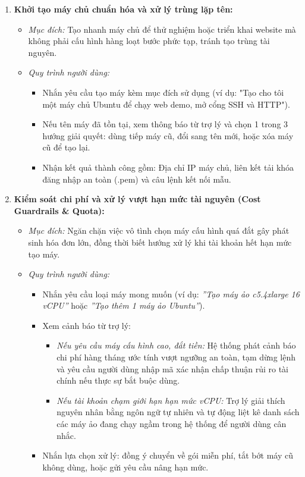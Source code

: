 \documentclass[a4paper,12pt]{article}
\begin{document}
\begin{enumerate}
  \item \textbf{Khởi tạo máy chủ chuẩn hóa và xử lý trùng lặp tên:}
  \begin{itemize}
    \item \textit{Mục đích:} Tạo nhanh máy chủ để thử nghiệm hoặc triển khai website mà không phải cấu hình hàng loạt bước phức tạp, tránh tạo trùng tài nguyên.
    \item \textit{Quy trình người dùng:} 
    \begin{itemize}
      \item Nhắn yêu cầu tạo máy kèm mục đích sử dụng (ví dụ: "Tạo cho tôi một máy chủ Ubuntu để chạy web demo, mở cổng SSH và HTTP").
      \item Nếu tên máy đã tồn tại, xem thông báo từ trợ lý và chọn 1 trong 3 hướng giải quyết: dùng tiếp máy cũ, đổi sang tên mới, hoặc xóa máy cũ để tạo lại.
      \item Nhận kết quả thành công gồm: Địa chỉ IP máy chủ, liên kết tải khóa đăng nhập an toàn (.pem) và câu lệnh kết nối mẫu.
    \end{itemize}
  \end{itemize}

  \item \textbf{Kiểm soát chi phí và xử lý vượt hạn mức tài nguyên (Cost Guardrails \& Quota):}
  \begin{itemize}
    \item \textit{Mục đích:} Ngăn chặn việc vô tình chọn máy cấu hình quá đắt gây phát sinh hóa đơn lớn, đồng thời biết hướng xử lý khi tài khoản hết hạn mức tạo máy.
    \item \textit{Quy trình người dùng:}
    \begin{itemize}
      \item Nhắn yêu cầu loại máy mong muốn (ví dụ: \textit{''Tạo máy ảo c5.4xlarge 16 vCPU''} hoặc \textit{''Tạo thêm 1 máy ảo Ubuntu''}).
      \item Xem cảnh báo từ trợ lý:
      \begin{itemize}
        \item \textit{Nếu yêu cầu máy cấu hình cao, đắt tiền:} Hệ thống phát cảnh báo chi phí hàng tháng ước tính vượt ngưỡng an toàn, tạm dừng lệnh và yêu cầu người dùng nhập mã xác nhận chấp thuận rủi ro tài chính nếu thực sự bắt buộc dùng.
        \item \textit{Nếu tài khoản chạm giới hạn hạn mức vCPU:} Trợ lý giải thích nguyên nhân bằng ngôn ngữ tự nhiên và tự động liệt kê danh sách các máy ảo đang chạy ngầm trong hệ thống để người dùng cân nhắc.
      \end{itemize}
      \item Nhắn lựa chọn xử lý: đồng ý chuyển về gói miễn phí, tắt bớt máy cũ không dùng, hoặc gửi yêu cầu nâng hạn mức.
    \end{itemize}
  \end{itemize}


\end{enumerate}
\end{document}
